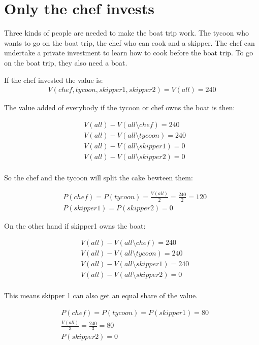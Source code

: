 \documentclass[12pt]{report}
\numberwithin{equation}{section}
\begin{document}
\section{Only the chef invests}

Three kinds of people are needed to make the boat trip work. The tycoon who wants to go on the boat trip, the chef who can cook and a skipper. The chef can undertake a private investment to learn how to cook before the boat trip. To go on the boat trip, they also need a boat. 

If the chef invested the value is:
\begin{align*}
V(chef,tycoon,skipper1, skipper2) = V(all)= 240
\end{align*}

The value added of everybody if the tycoon or chef owns the boat is then:

\begin{align*}
& V(all)-V(all \setminus chef)= 240 \\
& V(all)-V(all \setminus tycoon) = 240 \\
& V(all)-V(all \setminus skipper1)= 0 \\
& V(all)-V(all \setminus skipper2) = 0 \\
\end{align*}

So the chef and the tycoon will split the cake bewteen them:

\begin{align*}
& P(chef)=P(tycoon) = \frac{V(all)}{2}=\frac{240}{2} =120 \\
& P(skipper1)=P(skipper2)=0
\end{align*}

On the other hand if skipper1 owns the boat: 

\begin{align*}
&V(all)-V(all \setminus chef)= 240 \\
&V(all)-V(all \setminus tycoon)= 240  \\
&V(all)-V(all \setminus skipper1)= 240 \\
&V(all)-V(all \setminus skipper2) = 0 \\
\end{align*}

This means skipper 1 can also get an equal share of the value. 

\begin{align*}
&P(chef)=P(tycoon)=P(skipper1) = 80 \\
&\frac{V(all)}{3}=\frac{240}{3} =80 \\
&P(skipper2)=0
\end{align*}
\end{document}
